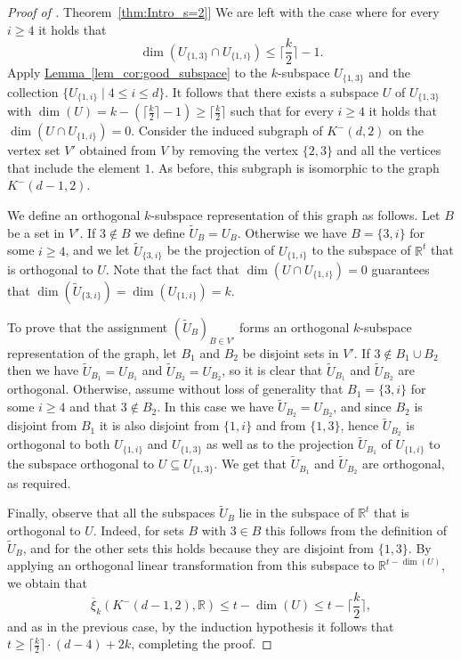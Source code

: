 \documentclass[11pt]{article}
\numberwithin{equation}{section}
\theoremstyle{definition}
\theoremstyle{plain}
\newcommand{\R}{\mathbb R}
\newcommand{\expref}[2]{\hyperref[#2]{#1~\ref{#2}}}
\newcommand{\od}{\overline{\xi}}
\begin{document}
\begin{proof}[Proof of \expref{Theorem}{thm:Intro_s=2}]
We are left with the case where for every $i \geq 4$ it holds that
\[\dim(U_{\{1,3\}} \cap U_{\{1,i\}}) \leq \Big\lceil \frac{k}{2} \Big\rceil -1.\]
Apply \expref{Lemma}{lem_cor:good_subspace} to the $k$-subspace $U_{\{1,3\}}$ and the collection $\{ U_{\{1,i\}} \mid 4 \leq i \leq d \}$.
It follows that there exists a subspace $U$ of $U_{\{1,3\}}$ with $\dim(U) = k- (\lceil \frac{k}{2} \rceil -1) \geq \lceil \frac{k}{2} \rceil$ such that for every $i \geq 4$ it holds that $\dim(U \cap U_{\{1,i\}}) = 0$.
Consider the induced subgraph of $K^{-}(d,2)$ on the vertex set $V'$ obtained from $V$ by removing the vertex $\{2,3\}$ and all the vertices that include the element $1$. As before, this subgraph is isomorphic to the graph $K^{-}(d-1,2)$.

We define an orthogonal $k$-subspace representation of this graph as follows.
Let $B$ be a set in $V'$.
If $3 \notin B$ we define $\widetilde{U}_B = U_B$.
Otherwise we have $B = \{3,i\}$ for some $i \geq 4$, and we let $\widetilde{U}_{\{3,i\}}$ be the projection of $U_{\{1,i\}}$ to the subspace of $\R^t$ that is orthogonal to $U$.
Note that the fact that $\dim(U \cap U_{\{1,i\}}) = 0$ guarantees that $\dim(\widetilde{U}_{\{3,i\}}) = \dim(U_{\{1,i\}}) = k$.

To prove that the assignment $(\widetilde{U}_B)_{B \in V'}$ forms an orthogonal $k$-subspace representation of the graph, let $B_1$ and $B_2$ be disjoint sets in $V'$.
If $3 \notin B_1 \cup B_2$ then we have $\widetilde{U}_{B_1} = U_{B_1}$ and $\widetilde{U}_{B_2} = U_{B_2}$, so it is clear that $\widetilde{U}_{B_1}$ and $\widetilde{U}_{B_2}$ are orthogonal.
Otherwise, assume without loss of generality that $B_1 = \{3,i\}$ for some $i \geq 4$ and that $3 \notin B_2$.
In this case we have $\widetilde{U}_{B_2} = U_{B_2}$, and since $B_2$ is disjoint from $B_1$ it is also disjoint from $\{1,i\}$ and from $\{1,3\}$, hence $\widetilde{U}_{B_2}$ is orthogonal to both $U_{\{1,i\}}$ and $U_{\{1,3\}}$ as well as to the projection $\widetilde{U}_{B_1}$ of $U_{\{1,i\}}$ to the subspace orthogonal to $U \subseteq U_{\{1,3\}}$.
We get that $\widetilde{U}_{B_1}$ and $\widetilde{U}_{B_2}$ are orthogonal, as required.

Finally, observe that all the subspaces $\widetilde{U}_{B}$ lie in the subspace of $\R^t$ that is orthogonal to $U$.
Indeed, for sets $B$ with $3 \in B$ this follows from the definition of $\widetilde{U}_{B}$, and for the other sets this holds because they are disjoint from $\{1,3\}$.
By applying an orthogonal linear transformation from this subspace to $\R^{t-\dim(U)}$, we obtain that
\[ \od_k(K^{-}(d-1,2),\R) \leq t- \dim(U) \leq t- \Big\lceil \frac{k}{2} \Big\rceil,\]
and as in the previous case, by the induction hypothesis it follows that
$t \geq \lceil \frac{k}{2} \rceil \cdot (d-4)+2k$, completing the proof.
\end{proof}
\end{document}
